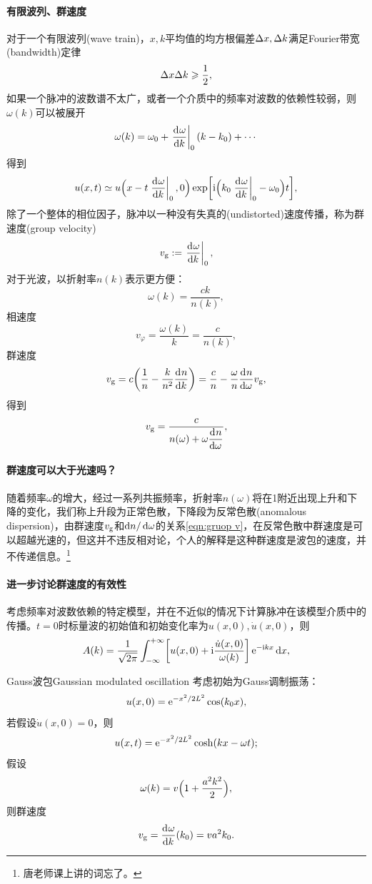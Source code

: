 \paragraph{有限波列、群速度}
对于一个有限波列(wave train)，$x,k$平均值的均方根偏差$\Delta x,\Delta k$满足Fourier带宽(bandwidth)定律
\begin{equation}
    \Delta x\Delta k\geqslant\frac12,
\end{equation}
如果一个脉冲的波数谱不太广，或者一个介质中的频率对波数的依赖性较弱，则$\omega(k)$可以被展开
\[
    \omega(k)=\omega_0+\left.\frac{\mathrm{d}^{{}}\omega}{\mathrm{d}{k}^{{}}}\right\rvert_0(k-k_0)+\cdots
\]
得到 
\[
    u(x,t)\simeq u\Bigl(x-t\left.\frac{\mathrm{d}^{{}}\omega}{\mathrm{d}{k}^{{}}}\right\rvert_0,0\Bigr)\exp\biggl[\mathrm{i}\Bigl(k_0\left.\frac{\mathrm{d}^{{}}\omega}{\mathrm{d}{k}^{{}}}\right\rvert_0-\omega_0\Bigr)t\biggr],
\]
除了一个整体的相位因子，脉冲以一种没有失真的(undistorted)速度传播，称为群速度(group velocity)
\begin{equation}
    v_\text g:=\left.\frac{\mathrm{d}^{{}}\omega}{\mathrm{d}{k}^{{}}}\right\rvert_0,
\end{equation}
对于光波，以折射率$n(k)$表示更方便：
\[
    \omega(k)=\frac{ck}{n(k)},
\]
相速度
\[
    v_\varphi=\frac{\omega(k)}k=\frac c{n(k)},
\]
群速度
\[
    v_\text g=c\biggl(\frac1n-\frac k{n^2}\frac{\mathrm{d}^{{}}n}{\mathrm{d}{k}^{{}}}\biggr)=\frac cn-\frac\omega n\frac{\mathrm{d}^{{}}n}{\mathrm{d}{\omega}^{{}}} v_\text g,
\]
得到 
\begin{equation}
    \label{eqn:gruop v}
    v_\text g=\frac c{\displaystyle n(\omega)+\omega\frac{\mathrm{d}^{{}}n}{\mathrm{d}{\omega}^{{}}}},
\end{equation}
\paragraph{群速度可以大于光速吗？}
随着频率$\omega$的增大，经过一系列共振频率，折射率$n(\omega)$将在1附近出现上升和下降的变化，我们称上升段为正常色散，下降段为反常色散(anomalous dispersion)，由群速度$v_\text g$和$\mathop{}\!\mathrm{d} n/\mathop{}\!\mathrm{d}\omega$的关系\eqref{eqn:gruop v}，在反常色散中群速度是可以超越光速的，但这并不违反相对论，个人的解释是这种群速度是波包的速度，并不传递信息。\footnote{唐老师课上讲的词忘了。}
\paragraph{进一步讨论群速度的有效性}
考虑频率对波数依赖的特定模型，并在不近似的情况下计算脉冲在该模型介质中的传播。$t=0$时标量波的初始值和初始变化率为$u(x,0),\dot u(x,0)$，则 
\[
    A(k)=\frac1{\sqrt{2\pi}}\int_{-\infty}^{+\infty}\biggl[u(x,0)+\mathrm{i}\frac{\dot u(x,0)}{\omega(k)}\biggr]\mathop{}\!\mathrm{e}^{-\mathrm{i} kx}\mathop{}\!\mathrm{d} x,
\]
\begin{example}{Gauss波包}{Gaussian modulated oscillation}
    考虑初始为Gauss调制振荡：
    \[
        u(x,0)=\mathop{}\!\mathrm{e}^{-x^2/2L^2}\cos(k_0x),
    \]
    若假设$\dot u(x,0)=0$，则
    \[
        u(x,t)=\mathop{}\!\mathrm{e}^{-x^2/2L^2}\cosh(kx-\omega t);
    \]
    \tcblower
    假设 
    \[
        \omega(k)=v\Bigl(1+\frac{a^2k^2}2\Bigr),
    \]
    则群速度
    \[
        v_\text g=\frac{\mathrm{d}^{{}}\omega}{\mathrm{d}{k}^{{}}}(k_0)=va^2k_0.
    \]
\end{example}

